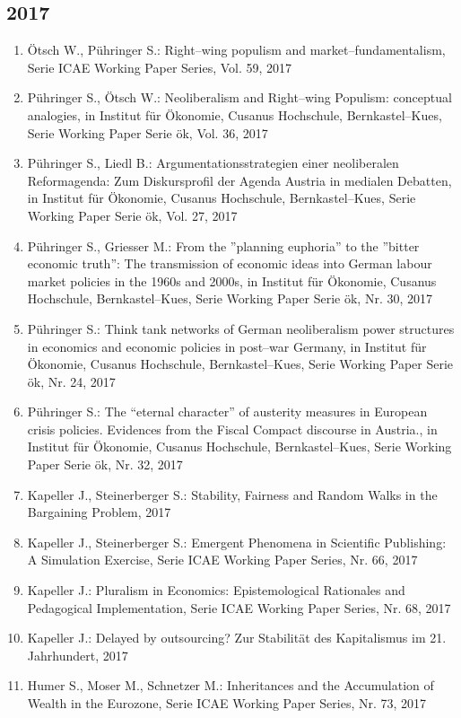 \subsection*{2017}
\begin{enumerate}
    	 \item Ötsch W., Pühringer S.: Right--wing populism and market--fundamentalism, Serie ICAE Working Paper Series, Vol. 59, 2017
	 \item Pühringer S., Ötsch W.: Neoliberalism and Right--wing Populism: conceptual analogies, in Institut für Ökonomie, Cusanus Hochschule, Bernkastel--Kues, Serie Working Paper Serie ök, Vol. 36, 2017
	 \item Pühringer S., Liedl B.: Argumentationsstrategien einer neoliberalen Reformagenda: Zum Diskursprofil der Agenda Austria in medialen Debatten, in Institut für Ökonomie, Cusanus Hochschule, Bernkastel--Kues, Serie Working Paper Serie ök, Vol. 27, 2017
	 \item Pühringer S., Griesser M.: From the ''planning euphoria'' to the ''bitter economic truth'': The transmission of economic ideas into German labour market policies in the 1960s and 2000s, in Institut für Ökonomie, Cusanus Hochschule, Bernkastel--Kues, Serie Working Paper Serie ök, Nr. 30, 2017
	 \item Pühringer S.: Think tank networks of German neoliberalism power structures in economics and economic policies in post--war Germany, in Institut für Ökonomie, Cusanus Hochschule, Bernkastel--Kues, Serie Working Paper Serie ök, Nr. 24, 2017
	 \item Pühringer S.: The “eternal character” of austerity measures in European crisis policies. Evidences from the Fiscal Compact discourse in Austria., in Institut für Ökonomie, Cusanus Hochschule, Bernkastel--Kues, Serie Working Paper Serie ök, Nr. 32, 2017
	 \item Kapeller J., Steinerberger S.: Stability, Fairness and Random Walks in the Bargaining Problem, 2017
	 \item Kapeller J., Steinerberger S.: Emergent Phenomena in Scientific Publishing: A Simulation Exercise, Serie ICAE Working Paper Series, Nr. 66, 2017
	 \item Kapeller J.: Pluralism in Economics: Epistemological Rationales and Pedagogical Implementation, Serie ICAE Working Paper Series, Nr. 68, 2017
	 \item Kapeller J.: Delayed by outsourcing? Zur Stabilität des Kapitalismus im 21. Jahrhundert, 2017
	 \item Humer S., Moser M., Schnetzer M.: Inheritances and the Accumulation of Wealth in the Eurozone, Serie ICAE Working Paper Series, Nr. 73, 2017

\end{enumerate}
